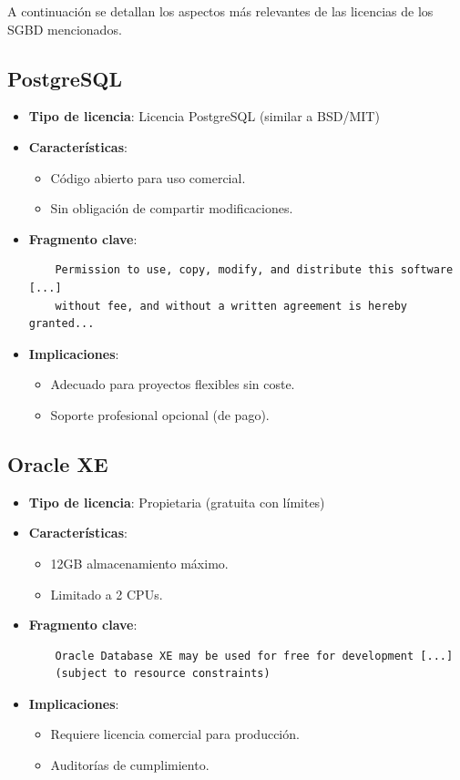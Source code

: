 \documentclass{article}
\begin{document}
A continuación se detallan los aspectos más relevantes de las licencias de los SGBD mencionados.

\subsection{PostgreSQL}
\begin{itemize}
    \item \textbf{Tipo de licencia}: Licencia PostgreSQL (similar a BSD/MIT)
    \item \textbf{Características}:
    \begin{itemize}
        \item Código abierto para uso comercial.
        \item Sin obligación de compartir modificaciones.
    \end{itemize}
    \item \textbf{Fragmento clave}:
    \begin{verbatim}
    Permission to use, copy, modify, and distribute this software [...] 
    without fee, and without a written agreement is hereby granted...
    \end{verbatim}
    \item \textbf{Implicaciones}:
    \begin{itemize}
        \item Adecuado para proyectos flexibles sin coste.
        \item Soporte profesional opcional (de pago).
    \end{itemize}
\end{itemize}

\subsection{Oracle XE}
\begin{itemize}
    \item \textbf{Tipo de licencia}: Propietaria (gratuita con límites)
    \item \textbf{Características}:
    \begin{itemize}
        \item 12GB almacenamiento máximo.
        \item Limitado a 2 CPUs.
    \end{itemize}
    \item \textbf{Fragmento clave}:
    \begin{verbatim}
    Oracle Database XE may be used for free for development [...] 
    (subject to resource constraints)
    \end{verbatim}
    \item \textbf{Implicaciones}:
    \begin{itemize}
        \item Requiere licencia comercial para producción.
        \item Auditorías de cumplimiento.
    \end{itemize}
\end{itemize}
\end{document}
